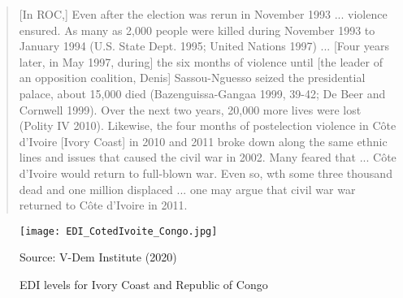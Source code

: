 \documentclass [11pt]{article}
\begin{document}
\begin{quote}
\small
[In ROC,] Even after the election was rerun in November 1993 ... violence ensured. As many as 2,000 people were killed during November 1993 to January 1994 (U.S. State Dept. 1995; United Nations 1997) ... [Four years later, in May 1997, during] the six months of violence until [the leader of an opposition coalition, Denis] Sassou-Nguesso seized the presidential palace, about 15,000 died (Bazenguissa-Gangaa 1999, 39-42; De Beer and Cornwell 1999). Over the next two years, 20,000 more lives were lost (Polity IV 2010). Likewise, the four months of postelection violence in Côte d'Ivoire [Ivory Coast] in 2010 and 2011 broke down along the same ethnic lines and issues that caused the civil war in 2002. Many feared that ... Côte d'Ivoire would return to full-blown war. Even so, wth some three thousand dead and one million displaced ... one may argue that civil war war returned to Côte d'Ivoire in 2011.
\end{quote}

\begin{figure} [h!]

\caption{EDI levels for Ivory Coast and Republic of Congo}
\label{fig2}%
\begin{center} 
\small
 \texttt{[image: EDI\_CotedIvoite\_Congo.jpg]}
 
{\footnotesize Source: V-Dem Institute (2020)}

\end{center} 
\end{figure}
\end{document}
